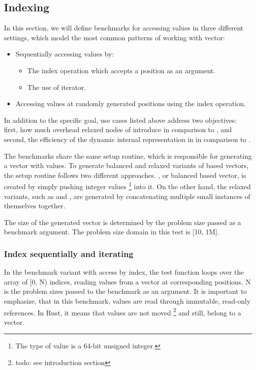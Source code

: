 \subsection{Indexing}
In this section, we will define benchmarks for accessing values in three different settings, which model the most common patterns of working with vector: 

\begin{itemize}
    \item Sequentially accessing values by:    
    \begin{itemize}
        \item The index operation which accepts a position as an argument. 
        \item The use of iterator. 
    \end{itemize}
    \item Accessing values at randomly generated positions using the index operation. 
\end{itemize}

In addition to the specific goal, use cases listed above address two objectives: first, how much overhead relaxed nodes of \rrbtree{} introduce in comparison to \rbtree{}, and second, the efficiency of the dynamic internal representation in \pvec{} in comparison to \stdvec{}.

The benchmarks share the same setup routine, which is responsible for generating a vector with values. To generate balanced and relaxed variants of \rbtree{} based vectors, the setup routine follows two different approaches. \rbvec{}, or balanced \rbtree{} based vector, is created by simply pushing integer values \footnote{The type of value is a 64-bit unsigned integer.} into it. On the other hand, the relaxed variants, such as \rrbvec{} and \pvec{}, are generated by concatenating multiple small instances of themselves together.

The size of the generated vector is determined by the problem size passed as a benchmark argument. The problem size domain in this test is [10, 1M]. 

\subsubsection*{Index sequentially and iterating}
In the benchmark variant with access by index, the test function loops over the array of [0, N) indices, reading values from a vector at corresponding positions. N is the problem sizes passed to the benchmark as an argument. It is important to emphasize, that in this benchmark, values are read through immutable, read-only references. In Rust, it means that values are not moved \footnote{todo: see introduction section} and still, belong to a vector. 

